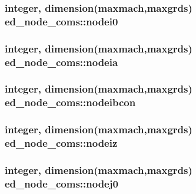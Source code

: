 \subsubsection[{\texorpdfstring{nodei0}{nodei0}}]{\setlength{\rightskip}{0pt plus 5cm}integer, dimension(maxmach,maxgrds) ed\+\_\+node\+\_\+coms\+::nodei0}\hypertarget{namespaceed__node__coms_a1c7fca6c0b4e16a6c824966437383262}{}\label{namespaceed__node__coms_a1c7fca6c0b4e16a6c824966437383262}
\subsubsection[{\texorpdfstring{nodeia}{nodeia}}]{\setlength{\rightskip}{0pt plus 5cm}integer, dimension(maxmach,maxgrds) ed\+\_\+node\+\_\+coms\+::nodeia}\hypertarget{namespaceed__node__coms_a829855ba74deed2626857b865e7408da}{}\label{namespaceed__node__coms_a829855ba74deed2626857b865e7408da}
\subsubsection[{\texorpdfstring{nodeibcon}{nodeibcon}}]{\setlength{\rightskip}{0pt plus 5cm}integer, dimension(maxmach,maxgrds) ed\+\_\+node\+\_\+coms\+::nodeibcon}\hypertarget{namespaceed__node__coms_acbb4bfd87dc840f6823b6a5ae9753040}{}\label{namespaceed__node__coms_acbb4bfd87dc840f6823b6a5ae9753040}
\subsubsection[{\texorpdfstring{nodeiz}{nodeiz}}]{\setlength{\rightskip}{0pt plus 5cm}integer, dimension(maxmach,maxgrds) ed\+\_\+node\+\_\+coms\+::nodeiz}\hypertarget{namespaceed__node__coms_ac7587c43282c2cc903564724b117098b}{}\label{namespaceed__node__coms_ac7587c43282c2cc903564724b117098b}
\subsubsection[{\texorpdfstring{nodej0}{nodej0}}]{\setlength{\rightskip}{0pt plus 5cm}integer, dimension(maxmach,maxgrds) ed\+\_\+node\+\_\+coms\+::nodej0}\hypertarget{namespaceed__node__coms_a8cb55126a161c5cf71f938898292cf77}{}\label{namespaceed__node__coms_a8cb55126a161c5cf71f938898292cf77}
